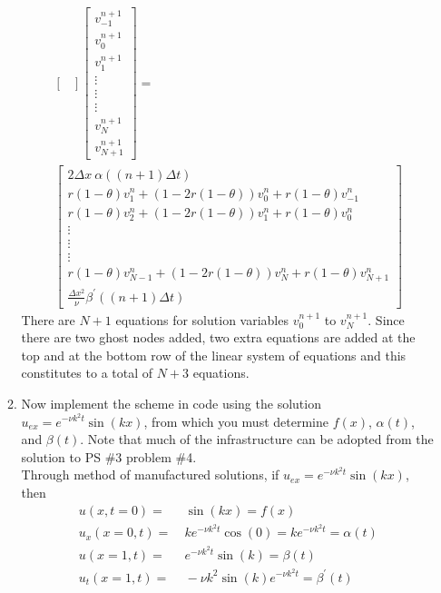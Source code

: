 \documentclass[11pt]{article}
\newcommand{\dx}{\Delta x}
\newcommand{\dt}{\Delta t}
\newcommand{\bra}[1]{\left(#1\right)}
\begin{document}
\begin{enumerate}
\begin{enumerate}
\begin{align*}
\begin{bmatrix}
      \end{bmatrix} 
      \begin{bmatrix}
      v^{n+1}_{-1}\\
      v^{n+1}_{0} \\
      v^{n+1}_{1} \\
      \vdots \\
      \vdots \\
      \vdots \\
      v^{n+1}_{N} \\
      v^{n+1}_{N+1}
      \end{bmatrix} = \\
      \begin{bmatrix}
      2\dx \ \alpha\bra{\bra{n+1}\dt} \\
      r\bra{1-\theta}v^{n}_{1} + \bra{1-2r\bra{1-\theta}}v^{n}_{0} + r\bra{1-\theta}v^{n}_{-1} \\
      r\bra{1-\theta}v^{n}_{2} + \bra{1-2r\bra{1-\theta}}v^{n}_{1} + r\bra{1-\theta}v^{n}_{0} \\
      \vdots \\
      \vdots \\
      \vdots \\
      r\bra{1-\theta}v^{n}_{N-1} + \bra{1-2r\bra{1-\theta}}v^{n}_{N} + r\bra{1-\theta}v^{n}_{N+1} \\
      \frac{\dx^2}{\nu}\beta^{'}\bra{\bra{n+1}\dt}
      \end{bmatrix}
      \end{align*}
      There are $N+1$ equations for solution variables $v^{n+1}_{0}$ to $v^{n+1}_{N}$. Since there are two ghost nodes added, two extra equations are added at the top and at the bottom row of the linear system of equations and this constitutes to a total of $N+3$ equations. \\
      \item {\color{blue}Now implement the scheme in code using the solution} $u_{ex} = e^{-\nu k^2 t} \sin(kx)${\color{blue}, from which you must determine }$f(x)${\color{blue},} $\alpha(t)${\color{blue}, and }$\beta(t)${\color{blue}. Note that much of the infrastructure can be adopted from the solution to PS \#3 problem \#4.} \\
      
      Through method of manufactured solutions, if $u_{ex} = e^{-\nu k^2 t}\sin\bra{kx}$, then 
      \begin{align*}
      u\bra{x,t=0} = & \ \sin\bra{kx} = f\bra{x} \\
      u_{x}\bra{x=0,t} = & \ ke^{-\nu k^2 t} \cos \bra{0} = k e^{-\nu k^2 t } = \alpha \bra{t} \\
      u\bra{x=1,t} = & \ e^{-\nu k^2 t} \sin\bra{k} = \beta\bra{t} \\
      u_t \bra{x=1,t} = & \ -\nu k^2 \sin\bra{k} e^{-\nu k^2 t} =   \beta^{'}\bra{t}
      \end{align*}
      

\end{enumerate}
\end{enumerate}
\end{document}
